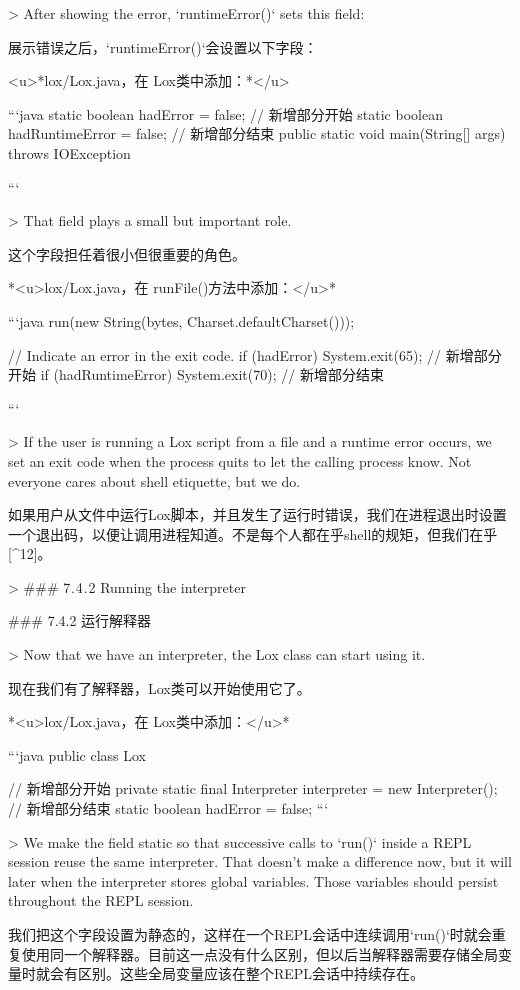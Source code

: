 \documentclass[cn,11pt,chinese]{elegantbook}
\begin{document}
{{{> After showing the error, `runtimeError()` sets this field:

展示错误之后，`runtimeError()`会设置以下字段：

<u>*lox/Lox.java，在 Lox类中添加：*</u>

```java
  static boolean hadError = false;
  // 新增部分开始
  static boolean hadRuntimeError = false;
  // 新增部分结束
  public static void main(String[] args) throws IOException {
```

> That field plays a small but important role.

这个字段担任着很小但很重要的角色。

*<u>lox/Lox.java，在 runFile()方法中添加：</u>*

```java
    run(new String(bytes, Charset.defaultCharset()));

    // Indicate an error in the exit code.
    if (hadError) System.exit(65);
    // 新增部分开始
    if (hadRuntimeError) System.exit(70);
    // 新增部分结束
  }
```

> If the user is running a Lox script from a file and a runtime error occurs, we set an exit code when the process quits to let the calling process know. Not everyone cares about shell etiquette, but we do.

如果用户从文件中运行Lox脚本，并且发生了运行时错误，我们在进程退出时设置一个退出码，以便让调用进程知道。不是每个人都在乎shell的规矩，但我们在乎[^12]。

> ### 7 . 4 . 2 Running the interpreter

### 7.4.2 运行解释器

> Now that we have an interpreter, the Lox class can start using it.

现在我们有了解释器，Lox类可以开始使用它了。

*<u>lox/Lox.java，在 Lox类中添加：</u>*

```java
public class Lox {
  // 新增部分开始
  private static final Interpreter interpreter = new Interpreter();
  // 新增部分结束
  static boolean hadError = false;
```

> We make the field static so that successive calls to `run()` inside a REPL session reuse the same interpreter. That doesn’t make a difference now, but it will later when the interpreter stores global variables. Those variables should persist throughout the REPL session.

我们把这个字段设置为静态的，这样在一个REPL会话中连续调用`run()`时就会重复使用同一个解释器。目前这一点没有什么区别，但以后当解释器需要存储全局变量时就会有区别。这些全局变量应该在整个REPL会话中持续存在。

}}}}
\end{document}
